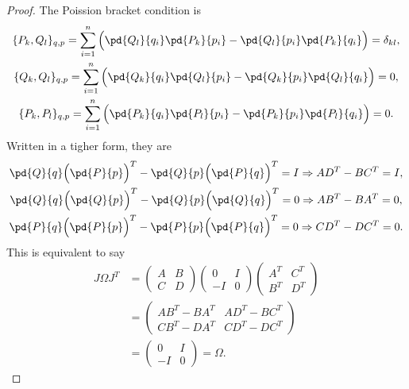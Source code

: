 \begin{proof}
    The Poission bracket condition is
    \begin{gather*}
        \{P_k,Q_l\}_{q,p} = \sum_{i=1}^{n}\Big(\pd{Q_l}{q_i}\pd{P_k}{p_i}
        -\pd{Q_l}{p_i}\pd{P_k}{q_i}\Big) = \delta_{kl}, \\
        \{Q_k,Q_l\}_{q,p} = \sum_{i=1}^{n}\Big(\pd{Q_k}{q_i}\pd{Q_l}{p_i}
        -\pd{Q_k}{p_i}\pd{Q_l}{q_i}\Big) = 0, \\
        \{P_k,P_l\}_{q,p} = \sum_{i=1}^{n}\Big(\pd{P_k}{q_i}\pd{P_l}{p_i}
        -\pd{P_k}{p_i}\pd{P_l}{q_i}\Big) = 0. 
    \end{gather*}
    Written in a tigher form, they are
    \begin{gather*}
        \pd{Q}{q}\Big(\pd{P}{p}\Big)^T-\pd{Q}{p}\Big(\pd{P}{q}\Big)^T = I 
        \Rightarrow A D^T - B C^T = I, \\
        \pd{Q}{q}\Big(\pd{Q}{p}\Big)^T-\pd{Q}{p}\Big(\pd{Q}{q}\Big)^T = 0 
        \Rightarrow A B^T - B A^T = 0, \\
        \pd{P}{q}\Big(\pd{P}{p}\Big)^T-\pd{P}{p}\Big(\pd{P}{q}\Big)^T = 0 
        \Rightarrow C D^T - D C^T = 0.
        \end{gather*}
    This is equivalent to say 
    \begin{align*}
        J \Omega J^T &= 
        \begin{pmatrix}
            A & B \\ C & D
        \end{pmatrix}
        \begin{pmatrix}
            0 & I \\ -I & 0
        \end{pmatrix}
        \begin{pmatrix}
            A^T & C^T \\ B^T & D^T
        \end{pmatrix}  \\ 
        &= 
        \begin{pmatrix}
            A B^T - B A^T & A D^T - B C^T \\
            C B^T - D A^T & C D^T - D C^T
        \end{pmatrix} \\
        &= 
        \begin{pmatrix}
            0 & I \\ -I & 0
        \end{pmatrix} = \Omega.
    \end{align*}
\end{proof}
